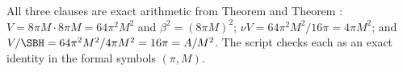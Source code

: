 All three clauses are exact arithmetic from Theorem  and Theorem : $V = 8\pi M \cdot 8\pi M = 64\pi^2 M^2$ and $\beta^2 = (8\pi M)^2$; $\nu V = 64\pi^2M^2/16\pi = 4\pi M^2$; and $V/\SBH = 64\pi^2M^2/4\pi M^2 = 16\pi = A/M^2$. The script checks each as an exact identity in the formal symbols $(\pi, M)$.
